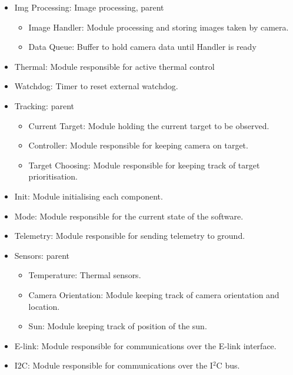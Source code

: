 \begin{itemize}

	\item Img Processing: Image processing, parent
		\begin{itemize}
			\item Image Handler: Module processing and storing images taken by camera.
			\item Data Queue: Buffer to hold camera data until Handler is ready
		\end{itemize}
		
	\item Thermal: Module responsible for active thermal control
	
	\item Watchdog: Timer to reset external watchdog.
	
	\item Tracking: parent
		\begin{itemize}
			\item Current Target: Module holding the current target to be observed.
			\item Controller: Module responsible for keeping camera on target.
			\item Target Choosing: Module responsible for keeping track of target prioritisation.
		\end{itemize}

	\item Init: Module initialising each component.
		
	\item Mode: Module responsible for the current state of the software.
	
	\item Telemetry: Module responsible for sending telemetry to ground.
	
	\item Sensors: parent
		\begin{itemize}
			\item Temperature: Thermal sensors.
			\item Camera Orientation: Module keeping track of camera orientation and location.
			\item Sun: Module keeping track of position of the sun.
		\end{itemize}
		
	\item E-link: Module responsible for communications over the E-link interface. 

	\item I2C: Module responsible for communications over the I$^2$C bus.


\end{itemize}
